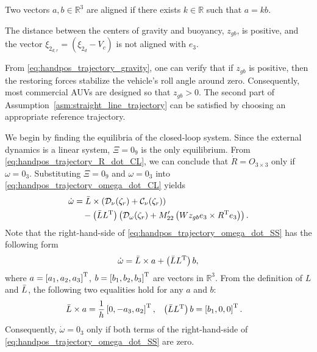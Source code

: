 \begin{dfn}
    Two vectors $a, b \in \mathbb{R}^3$ are aligned if there exists $k \in \mathbb{R}$ such that $a = kb$.
    \label{dfn:aligned}
\end{dfn}
\begin{asm}
    The distance between the centers of gravity and buoyancy, $z_{gb}$, is positive, and the vector $\xi_{2_{d, r}} = (\xi_{2_d} - V_c)$ is not aligned with $e_3$.
    \label{asm:straight_line_trajectory}
\end{asm}
\begin{rmk}
    From \eqref{eq:handpos_trajectory_gravity}, one can verify that if $z_{gb}$ is positive, then the restoring forces stabilize the vehicle's roll angle around zero.
    Consequently, most commercial AUVs are designed so that $z_{gb} > 0$.
    The second part of Assumption~\ref{asm:straight_line_trajectory} can be satisfied by choosing an appropriate reference trajectory.
\end{rmk}

We begin by finding the equilibria of the closed-loop system.
Since the external dynamics is a linear system, $\Xi = 0_{9}$ is the only equilibrium.
From \eqref{eq:handpos_trajectory_R_dot_CL}, we can conclude that $\dot{R} = O_{3 \times 3}$ only if $\omega = 0_3$.
Substituting $\Xi = 0_{9}$ and $\omega = 0_3$ into \eqref{eq:handpos_trajectory_omega_dot_CL} yields
\begin{equation}
    \begin{split}
        \dot{\omega} &= \Bar{L} \times \left(\mathcal{D}_{\nu}(\zeta_r) + \mathcal{C}_{\nu}(\zeta_r)\right) \\
        &\quad - \left(\Bar{L}L^{\mathrm{T}}\right) \left(\mathcal{D}_{\omega}(\zeta_r) + M_{22}^{\prime}\left(Wz_{gb} e_3 \times R^{\mathrm{T}} e_3\right)\right).
    \end{split}\label{eq:handpos_trajectory_omega_dot_SS}
\end{equation}
Note that the right-hand-side of \eqref{eq:handpos_trajectory_omega_dot_SS} has the following form
\begin{equation}
    \dot{\omega} = \Bar{L} \times a + \left(\Bar{L}L^{\mathrm{T}}\right) b,
\end{equation}
where $a = \left[a_1, a_2, a_3\right]^{\mathrm{T}}$, $b = \left[b_1, b_2, b_3\right]^{\mathrm{T}}$ are vectors in $\mathbb{R}^3$.
From the definition of $L$ and $\Bar{L}$, the following two equalities hold for any $a$ and $b$:
\begin{align}
    \Bar{L} \times a &= \frac{1}{h} \left[0, -a_3, a_2\right]^{\mathrm{T}}, &
    \left(\Bar{L}L^{\mathrm{T}}\right) b &= \left[b_1, 0, 0\right]^{\mathrm{T}}.
\end{align}
Consequently, $\dot{\omega} = 0_3$ only if both terms of the right-hand-side of \eqref{eq:handpos_trajectory_omega_dot_SS} are zero.

